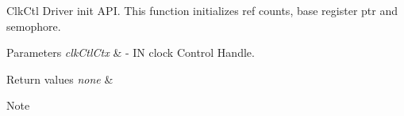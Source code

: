 ClkCtl Driver init API. This function initializes ref counts, base register ptr and semophore. 


\begin{DoxyParams}{Parameters}
{\em clkCtlCtx} & -\/ IN clock Control Handle. \\
\hline
\end{DoxyParams}

\begin{DoxyRetVals}{Return values}
{\em none} & \\
\hline
\end{DoxyRetVals}
\begin{DoxyNote}{Note}

\end{DoxyNote}
